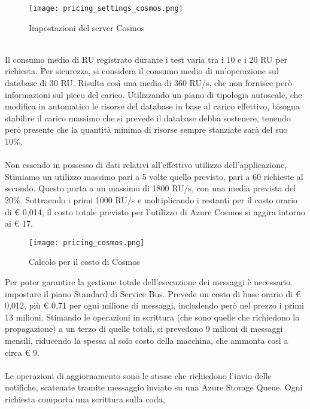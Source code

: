 \begin{figure}[htbp]
    \begin{center}
        \texttt{[image: pricing\_settings\_cosmos.png]}
        \caption{Impostazioni del server Cosmos}
    \end{center}
\end{figure}
\\
Il consumo medio di RU registrato durante i test 
varia tra i 10 e i 20 RU per richiesta.
Per sicurezza, si considera il consumo medio di un'operazione sul database
di 30 RU.
Risulta così una media di 360 RU/s,
che non fornisce però informazioni sul picco del carico. 
Utilizzando un piano di tipologia autoscale,
che modifica in automatico le risorse del database in base al carico effettivo,
bisogna stabilire il carico massimo che si prevede il database debba sostenere,
tenendo però presente che la quantità minima di risorse sempre stanziate sarà del suo 10\%.\\
\\
Non essendo in possesso di dati relativi all'effettivo utilizzo dell'applicazione,
Stimiamo un utilizzo massimo pari a 5 volte quello previsto, 
pari a 60 richieste al secondo.
Questo porta a un massimo di 1800 RU/s, con una media prevista del 20\%.
Sottraendo i primi 1000 RU/s e moltiplicando i restanti per il costo orario di € 0,014, 
il costo totale previsto per l'utilizzo di Azure Cosmos si aggira intorno ai € 17.\\
\begin{figure}[htbp]
    \begin{center}
        \texttt{[image: pricing\_cosmos.png]}
        \caption{Calcolo per il costo di Cosmos}
    \end{center}
\end{figure}
\clearpage
Per poter garantire la gestione totale dell'esecuzione dei messaggi
è necessario impostare il piano Standard di Service Bus.
Prevede un costo di base orario di € 0,012, 
più € 0,71 per ogni milione di messaggi, 
includendo però nel prezzo i primi 13 milioni.
Stimando le operazioni in scrittura
(che sono quelle che richiedono la propagazione)
a un terzo di quelle totali, si prevedono 9 milioni di messaggi mensili,
riducendo la spessa al solo costo della macchina, che ammonta così a circa € 9.\\
\\
Le operazioni di aggiornamento sono le stesse che richiedono 
l'invio delle notifiche, scatenate tramite messaggio inviato su una Azure Storage Queue.
Ogni richiesta comporta una scrittura sulla coda,
